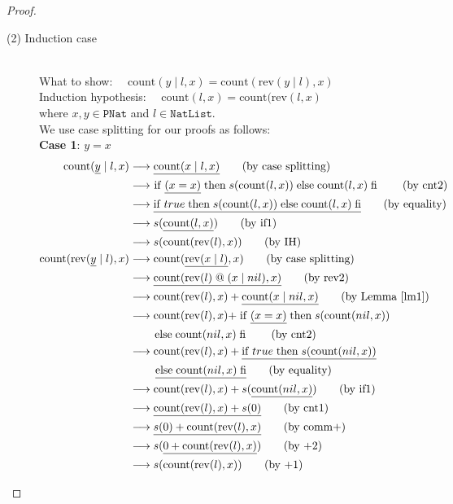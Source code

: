 \documentclass[12pt, a4paper]{article}
\newcommand{\rel}[1]{\mathrel{#1}}
\newcommand{\rmx}[1]{\mathrm{#1}}
\newcommand{\larrow}{\longrightarrow}
\newcommand{\under}{\underline}
\begin{document}
\begin{proof}
\begin{description}
\item[(2) Induction case]~\\
What to show: $\quad \rmx{count}(y \mid l, x) = \rmx{count}(\rmx{rev}(y \mid l), x)$ \\
Induction hypothesis: $\quad \rmx{count}(l, x) = \rmx{count}(\rmx{rev}(l, x)$  \\
where $x,y \in \mathtt{PNat}$ and $l \in \mathtt{NatList}$.\\
We use case splitting for our proofs as follows: \\
\textbf{Case 1}: $y = x$
\begin{align*}
\rmx{count}(\under{y} \mid l, x)
	&\larrow \under{\rmx{count}(x \mid l, x)} \tag{by case splitting} \\
	&\larrow\ \rel{\rmx{if}} \under{(x = x)} \rel{\rmx{then}} s(\rmx{count}(l, x)) \rel{\rmx{else}} \rmx{count}(l, x) \rel{\rmx{fi}} \tag{by cnt2} \\
	&\larrow \under{\rel{\rmx{if}} true \rel{\rmx{then}} s(\rmx{count}(l, x)) \rel{\rmx{else}} \rmx{count}(l, x) \rel{\rmx{fi}}} \tag{by equality} \\
	&\larrow s(\under{\rmx{count}(l, x)}) \tag{by if1} \\
	&\larrow s(\rmx{count}(\rmx{rev}(l), x)) \tag{by IH} \\
\rmx{count}(\rmx{rev}(\under{y} \mid l), x)
	&\larrow \rmx{count}(\under{\rmx{rev}(x \mid l)}, x) \tag{by case splitting} \\
	&\larrow \under{\rmx{count}(\rmx{rev}(l) \rel{@} (x \mid nil), x)} \tag{by rev2} \\
	&\larrow \rmx{count}(\rmx{rev}(l), x) + \under{\rmx{count}(x \mid nil, x)} \tag{by Lemma~\ref{lm1}} \\
	&\larrow \rmx{count}(\rmx{rev}(l), x) + \rel{\rmx{if}} \under{(x = x)} \rel{\rmx{then}} s(\rmx{count}(nil,x)) \\
	&\quad \quad \rel{\rmx{else}} \rmx{count}(nil,x) \rel{\rmx{fi}} \tag{by cnt2} \\
	&\larrow \rmx{count}(\rmx{rev}(l), x) + \under{\rel{\rmx{if}} true \rel{\rmx{then}} s(\rmx{count}(nil,x))} \\
	&\quad \quad\ \under{\rel{\rmx{else}} \rmx{count}(nil,x) \rel{\rmx{fi}}} \tag{by equality} \\
	&\larrow \rmx{count}(\rmx{rev}(l), x) + s(\under{\rmx{count}(nil,x)}) \tag{by if1} \\
	&\larrow \under{\rmx{count}(\rmx{rev}(l), x) + s(0)} \tag{by cnt1} \\
	&\larrow \under{s(0) + \rmx{count}(\rmx{rev}(l), x)} \tag{by comm+} \\
	&\larrow s(\under{0 + \rmx{count}(\rmx{rev}(l), x)}) \tag{by +2} \\
	&\larrow s(\rmx{count}(\rmx{rev}(l), x)) \tag{by +1}
\end{align*}


\end{description}
\end{proof}
\end{document}
